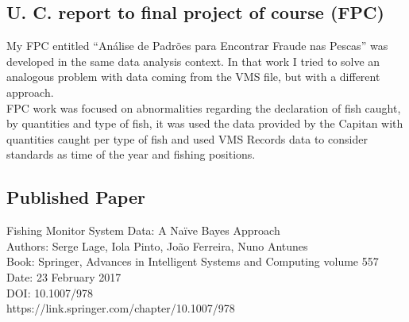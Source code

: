 \subsection{U. C. report to final project of course (FPC)} %
\label{sub:fpc}
My FPC entitled “Análise de Padrões para Encontrar Fraude nas Pescas” was developed in the same data analysis context. In that work I tried to solve an analogous problem with data coming from the VMS file, but with a different approach.\\
FPC work was focused on abnormalities regarding the declaration of fish caught, by quantities and type of fish, it was used the data provided by the Capitan with  quantities caught per type of fish and used VMS Records data to consider standards as time of the year and fishing positions.


\subsection{Published Paper} %
\label{sub:published_paper}
Fishing Monitor System Data: A Naïve Bayes Approach\\
Authors: Serge Lage, Iola Pinto, João Ferreira, Nuno Antunes\\
Book: Springer, Advances in Intelligent Systems and Computing volume 557\\
Date: 23 February 2017\\
DOI: 10.1007/978\\
https://link.springer.com/chapter/10.1007/978







